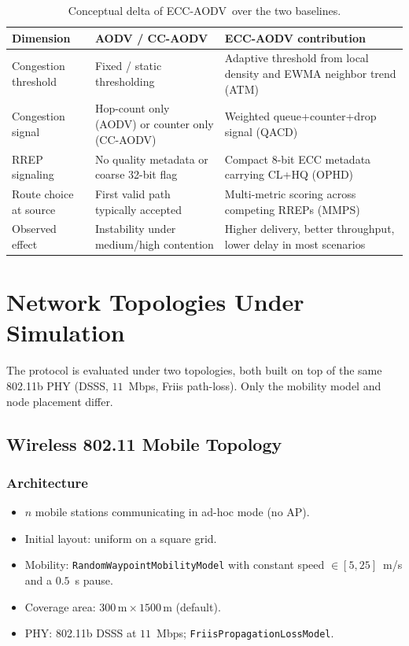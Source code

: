 \documentclass[11pt,a4paper]{article}
\newcommand{\ecc}{ECC-AODV}
\begin{document}
\begin{table}[h]
\centering
\caption{Conceptual delta of \ecc\ over the two baselines.}
\small
\begin{tabular}{p{3.0cm} p{4.0cm} p{6.8cm}}
    \toprule
    \textbf{Dimension} & \textbf{AODV / CC-AODV} & \textbf{ECC-AODV contribution} \\
\midrule
Congestion threshold & Fixed / static thresholding & Adaptive threshold from local density and EWMA neighbor trend (ATM) \\
Congestion signal & Hop-count only (AODV) or counter only (CC-AODV) & Weighted queue+counter+drop signal (QACD) \\
RREP signaling & No quality metadata or coarse 32-bit flag & Compact 8-bit ECC metadata carrying CL+HQ (OPHD) \\
Route choice at source & First valid path typically accepted & Multi-metric scoring across competing RREPs (MMPS) \\
Observed effect & Instability under medium/high contention & \textcolor{ecccol}{Higher delivery, better throughput, lower delay in most scenarios} \\
\bottomrule
\end{tabular}
\end{table}

\section{Network Topologies Under Simulation}
\label{sec:topology}

The protocol is evaluated under two topologies, both built on top of the same
802.11b PHY (DSSS, $11$~Mbps, Friis path-loss). Only the mobility model and
node placement differ.

\subsection{Wireless 802.11 Mobile Topology}

\subsubsection{Architecture}
\begin{itemize}
    \item $n$ mobile stations communicating in ad-hoc mode (no AP).
    \item Initial layout: uniform on a square grid.
    \item Mobility: \texttt{RandomWaypointMobilityModel} with constant speed
          $\in [5,25]$~m/s and a $0.5$~s pause.
    \item Coverage area: $300\,\text{m} \times 1500\,\text{m}$ (default).
    \item PHY: 802.11b DSSS at $11$~Mbps; \texttt{FriisPropagationLossModel}.
\end{itemize}
\end{document}
